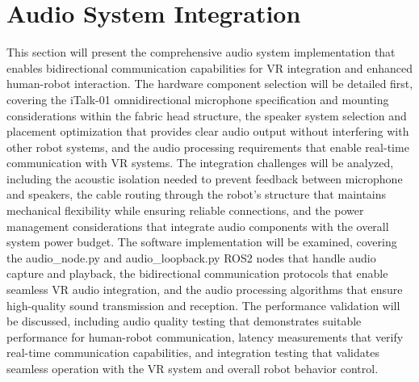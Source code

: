 \section{Audio System Integration}
This section will present the comprehensive audio system implementation that enables bidirectional communication capabilities for VR integration and enhanced human-robot interaction. The hardware component selection will be detailed first, covering the iTalk-01 omnidirectional microphone specification and mounting considerations within the fabric head structure, the speaker system selection and placement optimization that provides clear audio output without interfering with other robot systems, and the audio processing requirements that enable real-time communication with VR systems. The integration challenges will be analyzed, including the acoustic isolation needed to prevent feedback between microphone and speakers, the cable routing through the robot's structure that maintains mechanical flexibility while ensuring reliable connections, and the power management considerations that integrate audio components with the overall system power budget. The software implementation will be examined, covering the audio\_node.py and audio\_loopback.py ROS2 nodes that handle audio capture and playback, the bidirectional communication protocols that enable seamless VR audio integration, and the audio processing algorithms that ensure high-quality sound transmission and reception. The performance validation will be discussed, including audio quality testing that demonstrates suitable performance for human-robot communication, latency measurements that verify real-time communication capabilities, and integration testing that validates seamless operation with the VR system and overall robot behavior control.

